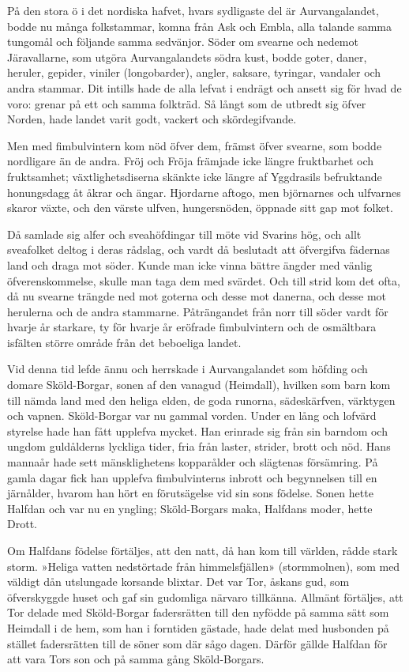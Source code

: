 På den stora ö i det nordiska hafvet, hvars sydligaste del är
Aurvangalandet, bodde nu många folkstammar, komna från Ask och Embla,
alla talande samma tungomål och följande samma sedvänjor. Söder om
svearne och nedemot Järavallarne, som utgöra Aurvangalandets södra kust,
bodde goter, daner, heruler, gepider, viniler (longobarder), angler,
saksare, tyringar, vandaler och andra stammar. Dit intills hade de alla
lefvat i endrägt och ansett sig för hvad de voro: grenar på ett och
samma folkträd. Så långt som de utbredt sig öfver Norden, hade landet
varit godt, vackert och skördegifvande.

Men med fimbulvintern kom nöd öfver dem, främst öfver svearne, som bodde
nordligare än de andra. Fröj och Fröja främjade icke längre fruktbarhet
och fruktsamhet; växtlighetsdiserna skänkte icke längre af Yggdrasils
befruktande honungsdagg åt åkrar och ängar. Hjordarne aftogo, men
björnarnes och ulfvarnes skaror växte, och den värste ulfven,
hungersnöden, öppnade sitt gap mot folket.

Då samlade sig alfer och sveahöfdingar till möte vid Svarins hög, och
allt sveafolket deltog i deras rådslag, och vardt då beslutadt att
öfvergifva fädernas land och draga mot söder. Kunde man icke vinna
bättre ängder med vänlig öfverenskommelse, skulle man taga dem med
svärdet. Och till strid kom det ofta, då nu svearne trängde ned mot
goterna och desse mot danerna, och desse mot herulerna och de andra
stammarne. Påträngandet från norr till söder vardt för hvarje år
starkare, ty för hvarje år eröfrade fimbulvintern och de osmältbara
isfälten större område från det beboeliga landet.

Vid denna tid lefde ännu och herrskade i Aurvangalandet som höfding och
domare Sköld-Borgar, sonen af den vanagud (Heimdall), hvilken som barn
kom till nämda land med den heliga elden, de goda runorna, sädeskärfven,
värktygen och vapnen. Sköld-Borgar var nu gammal vorden. Under en lång
och lofvärd styrelse hade han fått upplefva mycket. Han erinrade sig
från sin barndom och ungdom guldålderns lyckliga tider, fria från
laster, strider, brott och nöd. Hans mannaår hade sett mänsklighetens
kopparålder och slägtenas försämring. På gamla dagar fick han upplefva
fimbulvinterns inbrott och begynnelsen till en järnålder, hvarom han
hört en förutsägelse vid sin sons födelse. Sonen hette Halfdan och var
nu en yngling; Sköld-Borgars maka, Halfdans moder, hette Drott.

Om Halfdans födelse förtäljes, att den natt, då han kom till världen,
rådde stark storm. »Heliga vatten nedstörtade från himmelsfjällen»
(stormmolnen), som med väldigt dån utslungade korsande blixtar. Det var
Tor, åskans gud, som öfverskyggde huset och gaf sin gudomliga närvaro
tillkänna. Allmänt förtäljes, att Tor delade med Sköld-Borgar
fadersrätten till den nyfödde på samma sätt som Heimdall i de hem, som
han i forntiden gästade, hade delat med husbonden på stället
fadersrätten till de söner som där sågo dagen. Därför gällde Halfdan för
att vara Tors son och på samma gång Sköld-Borgars.

